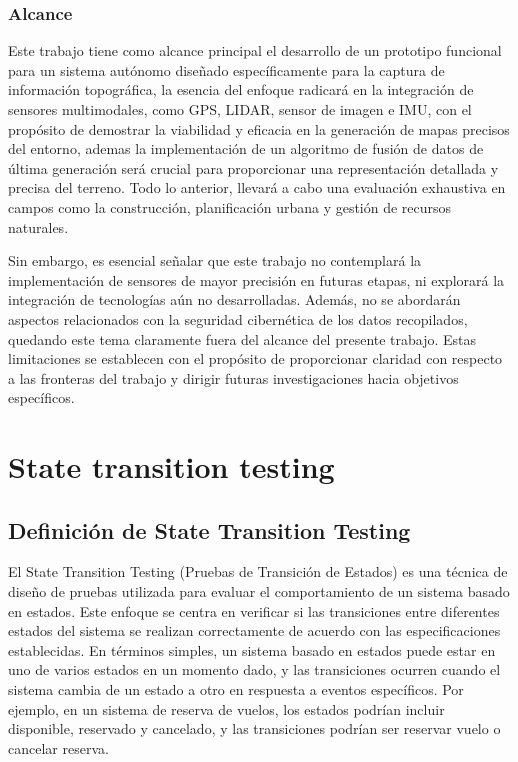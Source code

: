 \documentclass[12pt,a4paper, twoside]{article} %
\begin{document}
\subsubsection{Alcance}
\label{subsec:org12e44a2}


Este trabajo tiene como alcance principal el desarrollo de un prototipo funcional para un sistema autónomo diseñado específicamente para la captura de información topográfica, la esencia del enfoque radicará en la integración de sensores multimodales, como GPS, LIDAR, sensor de imagen e IMU, con el propósito de demostrar la viabilidad y eficacia en la generación de mapas precisos del entorno, ademas la implementación de un algoritmo de fusión de datos de última generación será crucial para proporcionar una representación detallada y precisa del terreno. Todo lo anterior, llevará a cabo una evaluación exhaustiva en campos como la construcción, planificación urbana y gestión de recursos naturales.

Sin embargo, es esencial señalar que este trabajo no contemplará la implementación de sensores de mayor precisión en futuras etapas, ni explorará la integración de tecnologías aún no desarrolladas. Además, no se abordarán aspectos relacionados con la seguridad cibernética de los datos recopilados, quedando este tema claramente fuera del alcance del presente trabajo. Estas limitaciones se establecen con el propósito de proporcionar claridad con respecto a las fronteras del trabajo y dirigir futuras investigaciones hacia objetivos específicos.

\newpage
\section{State transition testing}
\label{sec:orgc1c4017}

\subsection{Definición de State Transition Testing}
\label{sec:orgdaca22c}



El State Transition Testing (Pruebas de Transición de Estados) es una técnica de diseño de pruebas utilizada para evaluar el comportamiento de un sistema basado en estados. Este enfoque se centra en verificar si las transiciones entre diferentes estados del sistema se realizan correctamente de acuerdo con las especificaciones establecidas. En términos simples, un sistema basado en estados puede estar en uno de varios estados en un momento dado, y las transiciones ocurren cuando el sistema cambia de un estado a otro en respuesta a eventos específicos. Por ejemplo, en un sistema de reserva de vuelos, los estados podrían incluir disponible, reservado y cancelado, y las transiciones podrían ser reservar vuelo o cancelar reserva.
\end{document}
